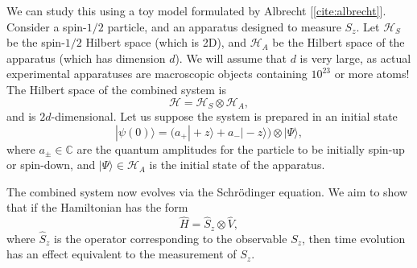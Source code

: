 \documentclass[pra,12pt]{revtex4}
\begin{document}
We can study this using a toy model formulated by Albrecht
[\ref{cite:albrecht}].  Consider a spin-$1/2$ particle, and an
apparatus designed to measure $S_z$.  Let $\mathscr{H}_S$ be the
spin-$1/2$ Hilbert space (which is 2D), and $\mathscr{H}_A$ be the
Hilbert space of the apparatus (which has dimension $d$).  We will
assume that $d$ is very large, as actual experimental apparatuses are
macroscopic objects containing $10^{23}$ or more atoms!  The Hilbert
space of the combined system is
\begin{equation}
  \mathscr{H} = \mathscr{H}_S \otimes \mathscr{H}_A,
\end{equation}
and is $2d$-dimensional.  Let us suppose the system is prepared in an initial
state
\begin{equation}
  |\psi(0)\rangle = \Big(a_+ |\!+z\rangle + a_- |\!-z\rangle\Big) \otimes |\Psi\rangle,
\end{equation}
where $a_\pm\in\mathbb{C}$ are the quantum amplitudes for the particle
to be initially spin-up or spin-down, and $|\Psi\rangle \in
\mathscr{H}_A$ is the initial state of the apparatus.

The combined system now evolves via the Schr\"odinger equation.  We
aim to show that if the Hamiltonian has the form
\begin{equation}
  \hat{H} = \hat{S}_z \otimes \hat{V},
\end{equation}
where $\hat{S}_z$ is the operator corresponding to the observable
$S_z$, then time evolution has an effect equivalent to the measurement
of $S_z$.
\end{document}
